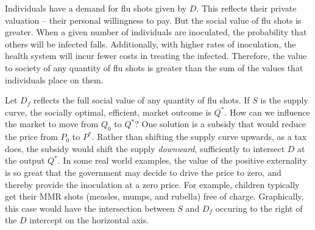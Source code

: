 Individuals have a demand for flu shots given by $D$. This reflects their
private valuation -- their personal willingness to pay. But the social value
of flu shots is greater. When a given number of individuals are inoculated,
the probability that others will be infected falls. Additionally, with
higher rates of inoculation, the health system will incur fewer costs in
treating the infected. Therefore, the value to society of any quantity of
flu shots is greater than the sum of the values that individuals place on
them.



\newhtmlpage



Let $D_f$ reflects the full social value of any quantity of flu shots. If $%
S$ is the supply curve, the socially optimal, efficient, market outcome is
$Q^*$. How can we influence the market to move from $Q_0$ to $Q^*$?
One solution is a subsidy that would reduce the price from $P_0$ to $P^*$.
Rather than shifting the supply curve upwards, as a tax does,
the subsidy would shift the supply \textit{downward}, sufficiently to
intersect $D$ at the output $Q^*$. In some real world examples, the
value of the positive externality is so great that the government may decide
to drive the price to zero, and thereby provide the inoculation at a zero
price. For example, children typically get their MMR shots (measles, mumps,
and rubella) free of charge. Graphically, this case would have the
intersection between $S$ and $D_f$ occuring to the right of the $D$
intercept on the horizontal axis.
